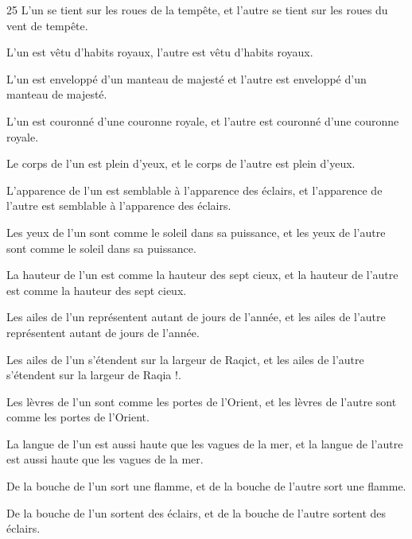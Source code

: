 \par 25 L'un se tient sur les roues de la tempête, et l'autre se tient sur les roues du vent de tempête.

\par L'un est vêtu d'habits royaux, l'autre est vêtu d'habits royaux.

\par L'un est enveloppé d'un manteau de majesté et l'autre est enveloppé d'un manteau de majesté.

\par L'un est couronné d'une couronne royale, et l'autre est couronné d'une couronne royale.

\par Le corps de l'un est plein d'yeux, et le corps de l'autre est plein d'yeux.

\par L'apparence de l'un est semblable à l'apparence des éclairs, et l'apparence de l'autre est semblable à l'apparence des éclairs.

\par Les yeux de l'un sont comme le soleil dans sa puissance, et les yeux de l'autre sont comme le soleil dans sa puissance.

\par La hauteur de l'un est comme la hauteur des sept cieux, et la hauteur de l'autre est comme la hauteur des sept cieux.

\par Les ailes de l'un représentent autant de jours de l'année, et les ailes de l'autre représentent autant de jours de l'année.

\par Les ailes de l'un s'étendent sur la largeur de Raqict, et les ailes de l'autre s'étendent sur la largeur de Raqia !.

\par Les lèvres de l'un sont comme les portes de l'Orient, et les lèvres de l'autre sont comme les portes de l'Orient.

\par La langue de l'un est aussi haute que les vagues de la mer, et la langue de l'autre est aussi haute que les vagues de la mer.

\par De la bouche de l'un sort une flamme, et de la bouche de l'autre sort une flamme.

\par De la bouche de l'un sortent des éclairs, et de la bouche de l'autre sortent des éclairs.

